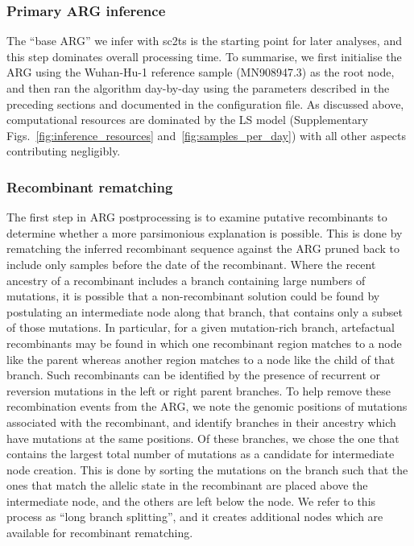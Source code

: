 \documentclass[12pt]{article}
\makeatletter
\newcommand{\refprefix}[1]{#1~}
\newcommand{\numref}[1]{{\let\refprefix\@gobble\ref{#1}}}
\makeatother
\begin{document}
\subsubsection*{Primary ARG inference}
The ``base ARG'' we infer with sc2ts is the starting point for later analyses,
and this step dominates overall processing time. To summarise, we first
initialise the ARG using the Wuhan-Hu-1 reference sample (MN908947.3) as the
root node, and then ran the algorithm day-by-day using the parameters
described in the preceding sections and documented in the configuration file.
As discussed above,
computational resources are dominated by the LS model
(Supplementary Figs.~\numref{fig:inference_resources} and~\numref{fig:samples_per_day}) with all
other aspects contributing negligibly.

\subsubsection*{Recombinant rematching}
The first step in ARG postprocessing is to examine putative recombinants to
determine whether a more parsimonious explanation is possible. This is done
by rematching the inferred recombinant sequence against the ARG pruned back
to include only samples before the date of the recombinant.
Where the recent ancestry of a recombinant includes a branch containing
large numbers of mutations, it is possible
that a non-recombinant solution could be found by postulating an intermediate
node along that branch, that contains only a subset of those mutations.
In particular, for a given mutation-rich branch, artefactual recombinants may
be found in which one recombinant region matches to
a node like the parent whereas another region matches to a node like the child
of that branch. Such recombinants can be identified by the
presence of recurrent or reversion mutations in the left or right parent branches.
To help remove these recombination events from the ARG, we note the genomic positions
of mutations associated with the recombinant, and identify branches
in their ancestry which have mutations at the same positions. Of these branches,
we chose the one that contains the largest total number of mutations as
a candidate for intermediate node creation. This is done by sorting the
mutations on the branch such that the ones that match the allelic state in the
recombinant are placed above the intermediate node, and the others are left
below the node. We refer to this process as ``long branch splitting'', and it
creates additional nodes which are available for recombinant rematching.
\end{document}
